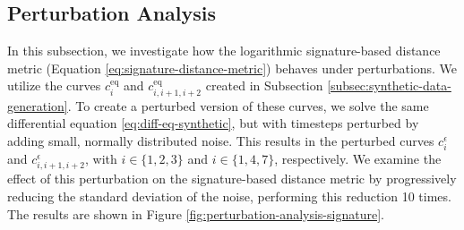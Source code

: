 \subsection{Perturbation Analysis}
\label{subsec:perturbation-analysis-signature}

In this subsection, we investigate how the logarithmic signature-based distance metric (Equation \eqref{eq:signature-distance-metric}) behaves under perturbations. We utilize the curves \(c_i^\text{eq}\) and \(c_{i,i+1,i+2}^\text{eq}\) created in Subsection \ref{subsec:synthetic-data-generation}. To create a perturbed version of these curves, we solve the same differential equation \eqref{eq:diff-eq-synthetic}, but with timesteps perturbed by adding small, normally distributed noise. This results in the perturbed curves \(c_i^\epsilon\) and \(c_{i,i+1,i+2}^\epsilon\), with \(i \in \{1,2,3\}\) and \(i \in \{1,4,7\}\), respectively. We examine the effect of this perturbation on the signature-based distance metric by progressively reducing the standard deviation of the noise, performing this reduction 10 times. The results are shown in Figure \ref{fig:perturbation-analysis-signature}.

